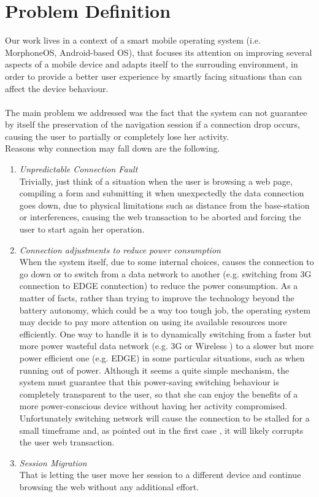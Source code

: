 \documentclass[11pt,a4paper]{article}
\begin{document}
\section{Problem Definition}
Our work lives in a context of a smart mobile operating system (i.e. MorphoneOS, Android-based OS), that focuses its attention on improving several aspects of a mobile device and adapts itself to the surrouding environment, in order to provide a better user experience by smartly facing situations than can affect the device behaviour.\\ \\
The main problem we addressed was the fact that the system can not guarantee by itself the preservation of the navigation session if a connection drop occurs, causing the user to partially or completely lose her activity.\\
Reasons why connection may fall down are the following.\\
\begin{enumerate}
\item \emph{Unpredictable Connection Fault} \\
	Trivially, just think of a situation when the user is browsing a web page, compiling a form and submitting it when unexpectedly the data connection goes down, due to physical 	limitations such as distance from the base-station or interferences, causing the web 	transaction to be aborted and forcing the user to start again her operation.
\item \emph{Connection adjustments to reduce power consumption} \\
	When the system itself, due to some internal choices, causes the connection to go down or to switch from a data network to another (e.g. switching from 3G connection to EDGE conntection) to reduce the power consumption. 
	As a matter of facts, rather than trying to improve the technology beyond the battery autonomy, which could be a way too tough job, the operating system may decide to pay more attention on using its available resources more efficiently. One way to handle it is to dynamically switching from a faster but more power wasteful data network (e.g. 3G or Wireless )  to a slower but more power efficient one (e.g. EDGE) in some particular situations, such as when running out of power.
	Although it seems a quite simple mechanism, the system must guarantee that this power-saving switching behaviour is completely transparent to the user, so that she can enjoy the benefits of a more power-conscious device without having her activity compromised. Unfortunately switching network will cause the connection to be stalled for a small timeframe and, as pointed out in the first case , it will likely corrupts the user web transaction.
\item \emph{Session Migration}\\
	That is letting the user move her session to a different device and continue browsing the web without any additional effort.
\end{enumerate}
\end{document}
